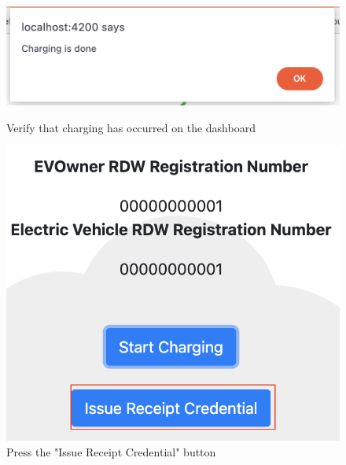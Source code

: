 \begin{figure}[H]
\centering
\begin{minipage}{.5\textwidth}
  \centering
  \includegraphics[width=.9\linewidth]{images/Frontend/Charging/12.png}
  \caption[]{Verify that charging has occurred on the dashboard}
  \label{fig:charging_screenshot_12}
\end{minipage}%
\begin{minipage}{.5\textwidth}
  \centering
  \includegraphics[width=.9\linewidth]{images/Frontend/Charging/13.png}
  \caption[]{Press the "Issue Receipt Credential" button}
  \label{fig:charging_screenshot_13}
\end{minipage}
\end{figure}

